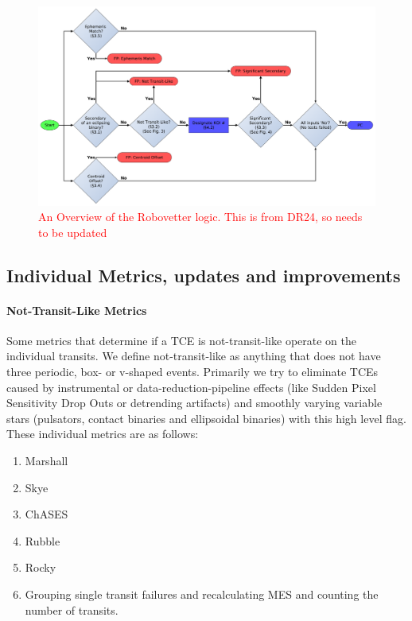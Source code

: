 \documentclass[onecolumn]{aastex6}
\newcommand\red{\textcolor{red}}
\begin{document}
\begin{figure}
\centering
\includegraphics[width=\linewidth]{RoboVetter-Diagram-V3-Overview.pdf}
\caption{\red{An Overview of the Robovetter logic. This is from DR24, so needs to be updated}}
\end{figure}

\subsection{Individual Metrics, updates and improvements}

\paragraph{Not-Transit-Like Metrics} 
Some metrics that determine if a TCE is not-transit-like operate on the individual transits. We define not-transit-like as anything that does not have three periodic, box- or v-shaped events. Primarily we try to eliminate TCEs caused by instrumental or data-reduction-pipeline effects (like Sudden Pixel Sensitivity Drop Outs or detrending artifacts) and smoothly varying variable stars (pulsators, contact binaries and ellipsoidal binaries) with this high level flag.   These individual metrics are as follows:
\begin{enumerate}
\item Marshall

\item Skye
\item ChASES
\item Rubble
\item Rocky
\item Grouping single transit failures and recalculating MES and counting the number of transits.
\end{enumerate}
\end{document}
